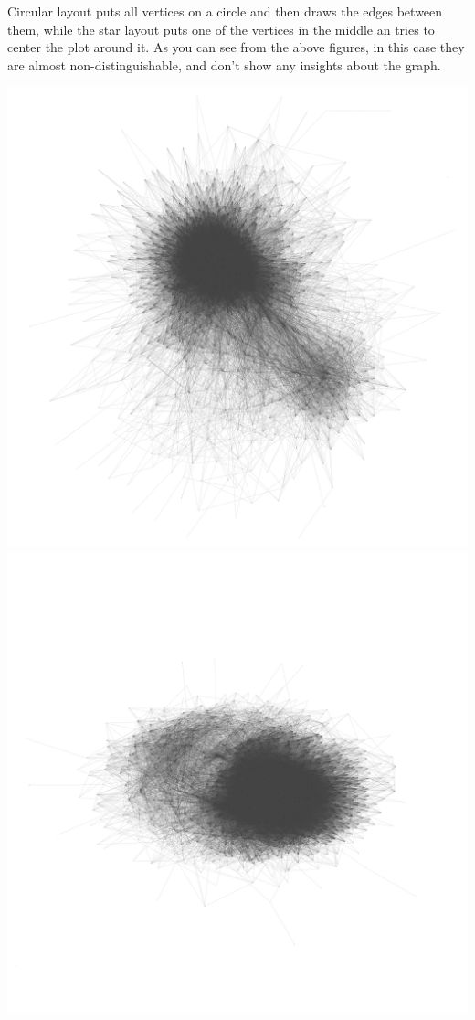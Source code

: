 \documentclass[12pt, a4paper]{article}
\begin{document}
Circular layout puts all vertices on a circle and then draws the edges between them, while the star layout puts one of the vertices in the middle an tries to center the plot around it. As you can see from the above figures, in this case they are almost non-distinguishable, and don't show any insights about the graph.

\begin{multicols}{2}
{\centering
\includegraphics[width=\columnwidth]{src/youtube/hdg/hdg_simple}
\label{fig:hdg_simple}}
{\centering
\includegraphics[width=\columnwidth]{src/youtube/hdg/comp/5_plot_kk}\\
}
\end{multicols}
\end{document}

